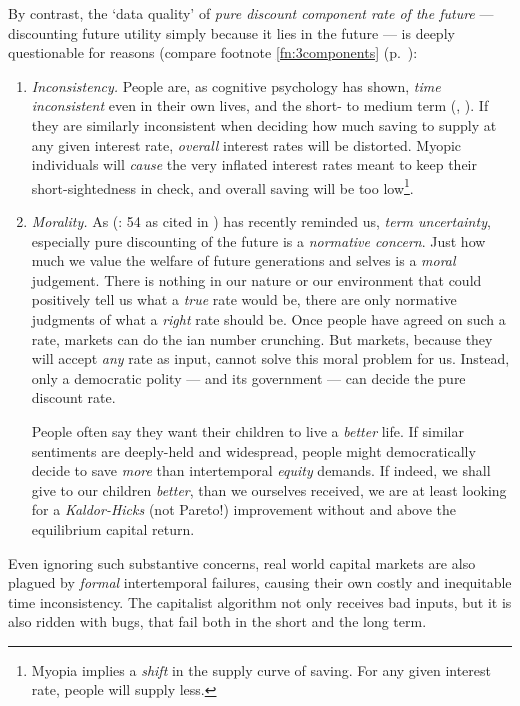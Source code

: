 By contrast, the `data quality' of \emph{pure discount component rate of the future} --- discounting future utility simply because it lies in the future --- is deeply questionable for reasons (compare footnote \ref{fn:3components} (p.~\pageref{fn:3components}):

\begin{enumerate}
	\item \emph{Inconsistency.} People are, as cognitive psychology has shown, \emph{time inconsistent} even in their own lives, and the short- to medium term (\citealt{Ainslie1975}, \citealt{Thaler1981}). If they are similarly inconsistent  when deciding how much saving to supply at any given interest rate, \emph{overall} interest rates will be distorted. Myopic individuals will \emph{cause} the very inflated interest rates meant to keep their short-sightedness in check, and overall saving will be too low\footnote{
		Myopia implies a \emph{shift} in the supply curve of saving. For any given interest rate, people will supply less.}.
	\item \emph{Morality.} As \citeauthor{Samuelson2005} (\citeyear{Samuelson2005}: 54 as cited in \citealt{Stern-2006-aa}) has recently reminded us, \emph{term uncertainty}, especially pure discounting of the future is a \emph{normative concern}. Just how much we value the welfare of future generations and selves is a \emph{moral} judgement. There is nothing in our nature or our environment that could positively tell us what a \emph{true} rate would be, there are only normative judgments of what a \emph{right} rate should be. Once people have agreed on such a rate, markets can do the \citeauthor{Hayek1931}ian number crunching. But markets, because they will accept \emph{any} rate as input, cannot solve this moral problem for us. Instead, only a democratic polity --- and its government --- can decide the pure discount rate.
		
	People often say they want their children to live a \emph{better} life. If similar sentiments are deeply-held and widespread, people might democratically decide to save \emph{more} than intertemporal \emph{equity} demands. If indeed, we shall give to our children \emph{better}, than we ourselves received, we are at least looking for a \emph{Kaldor-Hicks} (not Pareto!) improvement without and above the equilibrium capital return.
\end{enumerate}

Even ignoring such substantive concerns, real world capital markets are also plagued by \emph{formal} intertemporal failures, causing their own costly and inequitable time inconsistency. The capitalist algorithm not only receives bad inputs, but it is also ridden with bugs, that fail both in the short and the long term.


